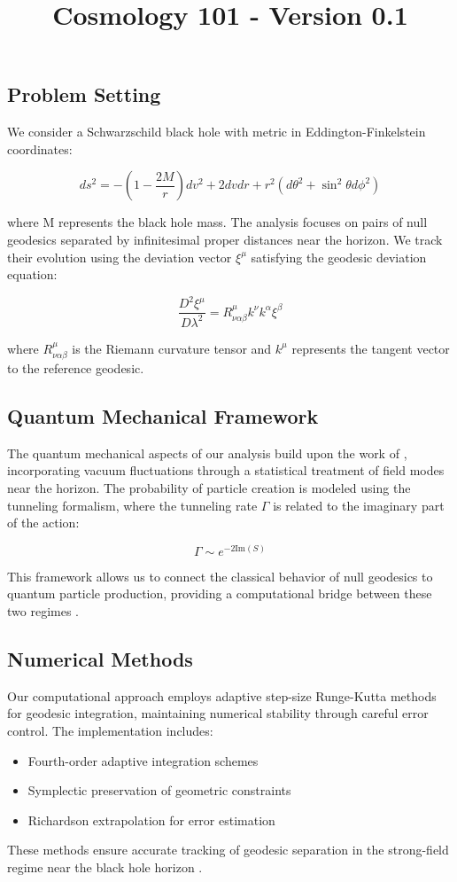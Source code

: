 \documentclass{article}\usepackage{graphicx} \usepackage{amsmath} \usepackage{colortbl}\title{Cosmology 101 - Version 0.1}
\begin{document}
\subsection{Problem Setting}
We consider a Schwarzschild black hole with metric in Eddington-Finkelstein coordinates:

\begin{equation}
ds^2 = -(1-\frac{2M}{r})dv^2 + 2dvdr + r^2(d\theta^2 + \sin^2\theta d\phi^2)
\end{equation}

where M represents the black hole mass. The analysis focuses on pairs of null geodesics separated by infinitesimal proper distances near the horizon. We track their evolution using the deviation vector $\xi^\mu$ satisfying the geodesic deviation equation:

\begin{equation}
\frac{D^2\xi^\mu}{D\lambda^2} = R^\mu_{\nu\alpha\beta}k^\nu k^\alpha \xi^\beta
\end{equation}

where $R^\mu_{\nu\alpha\beta}$ is the Riemann curvature tensor and $k^\mu$ represents the tangent vector to the reference geodesic.

\subsection{Quantum Mechanical Framework}
The quantum mechanical aspects of our analysis build upon the work of \cite{unruh1981}, incorporating vacuum fluctuations through a statistical treatment of field modes near the horizon. The probability of particle creation is modeled using the tunneling formalism, where the tunneling rate $\Gamma$ is related to the imaginary part of the action:

\begin{equation}
\Gamma \sim e^{-2\text{Im}(S)}
\end{equation}

This framework allows us to connect the classical behavior of null geodesics to quantum particle production, providing a computational bridge between these two regimes \cite{bekenstein1973}.

\subsection{Numerical Methods}
Our computational approach employs adaptive step-size Runge-Kutta methods for geodesic integration, maintaining numerical stability through careful error control. The implementation includes:

\begin{itemize}
\item Fourth-order adaptive integration schemes
\item Symplectic preservation of geometric constraints
\item Richardson extrapolation for error estimation
\end{itemize}

These methods ensure accurate tracking of geodesic separation in the strong-field regime near the black hole horizon \cite{visser1998}.
\end{document}
